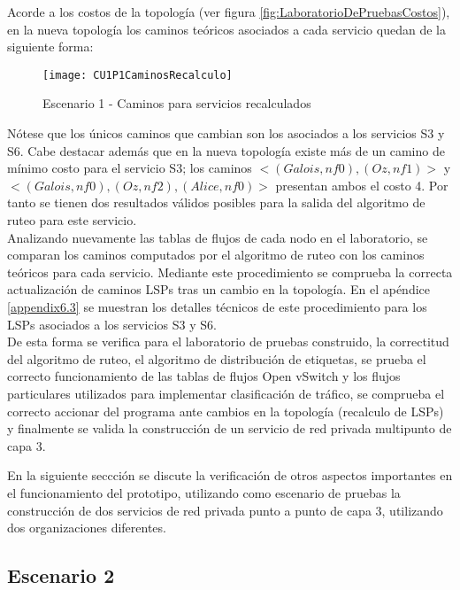 Acorde a los costos de la topolog\'ia (ver figura \ref{fig:LaboratorioDePruebasCostos}), en la nueva topolog\'ia los caminos te\'oricos asociados a cada servicio quedan de la siguiente forma:

\begin{figure}[h] 
\centering    
\texttt{[image: CU1P1CaminosRecalculo]}
\caption[Escenario 1 - Caminos para servicios recalculados]{Escenario 1 - Caminos para servicios recalculados}
\label{fig:CUP1Caminos2}
\end{figure}
 
N\'otese que los \'unicos caminos que cambian son los asociados a los servicios S3 y S6. Cabe destacar adem\'as que en la nueva topolog\'ia existe m\'as de un camino de m\'inimo costo para el servicio S3; los caminos $<(Galois, nf0), (Oz, nf1)>$ y \\ $<(Galois, nf0), (Oz, nf2), (Alice, nf0)>$ presentan ambos el costo 4. Por tanto se tienen dos resultados v\'alidos posibles para la salida del algoritmo de ruteo para este servicio.\\

Analizando nuevamente las tablas de flujos de cada nodo en el laboratorio, se comparan los caminos computados por el algoritmo de ruteo con los caminos te\'oricos para cada servicio. Mediante este procedimiento se comprueba la correcta actualizaci\'on de caminos LSPs tras un cambio en la topolog\'ia. En el ap\'endice \ref{appendix6.3} se muestran los detalles t\'ecnicos de este procedimiento para los LSPs asociados a los servicios S3 y S6.\\ 
 
De esta forma se verifica para el laboratorio de pruebas construido, la correctitud del algoritmo de ruteo, el algoritmo de distribución de etiquetas, se prueba el correcto funcionamiento de las tablas de flujos Open vSwitch y los flujos particulares utilizados para implementar clasificación de tr\'afico, se comprueba el correcto accionar del programa ante cambios en la topolog\'ia (recalculo de LSPs) y finalmente se valida la construcción de un servicio de red privada multipunto de capa 3.

En la siguiente seccci\'on se discute la verificación de otros aspectos importantes en el funcionamiento del prototipo, utilizando como escenario de pruebas la construcci\'on de dos servicios de red privada punto a punto de capa 3, utilizando dos organizaciones diferentes.   

\subsection{Escenario 2}

